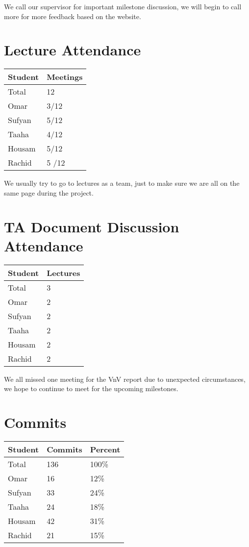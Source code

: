 \documentclass{article}
\begin{document}
We call our supervisor for important milestone discussion, we will begin to call more for more feedback based on the website. 
\section{Lecture Attendance}

\begin{table}[H]
\centering
\begin{tabular}{ll}
\toprule
\textbf{Student} & \textbf{Meetings}\\
\midrule
Total & 12\\
Omar & 3/12\\
Sufyan & 5/12\\
Taaha & 4/12\\
Housam & 5/12\\
Rachid & 5
/12\\
\bottomrule
\end{tabular}
\end{table}

We usually try to go to lectures as a team, just to make sure we are all on the same page during the project. 
\section{TA Document Discussion Attendance}

\begin{table}[H]
\centering
\begin{tabular}{ll}
\toprule
\textbf{Student} & \textbf{Lectures}\\
\midrule
Total & 3\\
Omar & 2\\
Sufyan & 2\\
Taaha & 2\\
Housam & 2\\
Rachid & 2\\
\bottomrule
\end{tabular}
\end{table}

We all missed one meeting for the VnV report due to unexpected circumstances, we hope to continue to meet for the upcoming milestones. 
\section{Commits}

\begin{table}[H]
\centering
\begin{tabular}{lll}
\toprule
\textbf{Student} & \textbf{Commits} & \textbf{Percent}\\
\midrule
Total & 136 & 100\% \\
Omar & 16 & 12\% \\ 
Sufyan & 33 & 24\% \\  
Taaha & 24 & 18\% \\  
Housam & 42 & 31\% \\  
Rachid & 21 & 15\% \\  
\bottomrule
\end{tabular}
\end{table}
\end{document}
